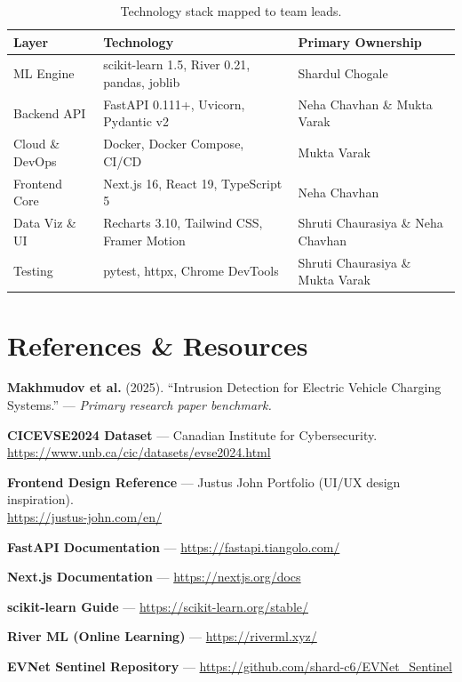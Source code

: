 \documentclass[11pt, a4paper]{article}
\begin{document}
\begin{table}[h!]
\centering
\small
\renewcommand{\arraystretch}{1.2}
\begin{tabularx}{\textwidth}{|l|l|X|}
\hline
\rowcolor{accent!15}
\textbf{Layer} & \textbf{Technology} & \textbf{Primary Ownership} \\
\hline
ML Engine & scikit-learn 1.5, River 0.21, pandas, joblib & Shardul Chogale \\
\hline
Backend API & FastAPI 0.111+, Uvicorn, Pydantic v2 & Neha Chavhan \& Mukta Varak \\
\hline
Cloud \& DevOps & Docker, Docker Compose, CI/CD & Mukta Varak \\
\hline
Frontend Core & Next.js 16, React 19, TypeScript 5 & Neha Chavhan \\
\hline
Data Viz \& UI & Recharts 3.10, Tailwind CSS, Framer Motion & Shruti Chaurasiya \& Neha Chavhan \\
\hline
Testing & pytest, httpx, Chrome DevTools & Shruti Chaurasiya \& Mukta Varak \\
\hline
\end{tabularx}
\caption{Technology stack mapped to team leads.}
\end{table}

\section{References \& Resources}
\label{sec:refs}

\begin{enumerate}[label={[\arabic*]}]
    \item \textbf{Makhmudov et al.} (2025). ``Intrusion Detection for Electric Vehicle Charging Systems.'' — \textit{Primary research paper benchmark.}

    \item \textbf{CICEVSE2024 Dataset} — Canadian Institute for Cybersecurity.\\
    \url{https://www.unb.ca/cic/datasets/evse2024.html}

    \item \textbf{Frontend Design Reference} — Justus John Portfolio (UI/UX design inspiration).\\
    \url{https://justus-john.com/en/}

    \item \textbf{FastAPI Documentation} — \url{https://fastapi.tiangolo.com/}

    \item \textbf{Next.js Documentation} — \url{https://nextjs.org/docs}

    \item \textbf{scikit-learn Guide} — \url{https://scikit-learn.org/stable/}

    \item \textbf{River ML (Online Learning)} — \url{https://riverml.xyz/}

    \item \textbf{EVNet Sentinel Repository} — \url{https://github.com/shard-c6/EVNet_Sentinel}
\end{enumerate}
\end{document}

